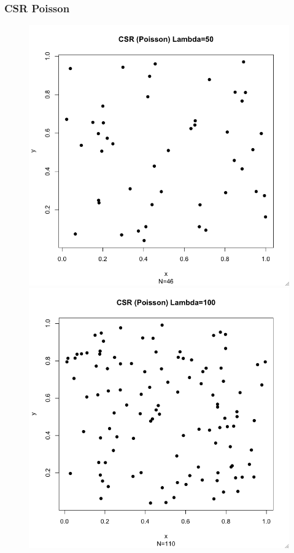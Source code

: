 \documentclass[nototal,handout]{beamer}
\begin{document}
\begin{frame}
	\frametitle{CSR Poisson}
 \begin{figure}[ht]
 \begin{minipage}[b]{0.4\linewidth}
  \centering
  \includegraphics[scale=0.20]{csrp50.png}
  \end{minipage}
 \begin{minipage}[b]{0.4\linewidth}
  \centering
  \includegraphics[scale=0.20]{csrp100.png}
  \end{minipage}
  \end{figure}
 \end{frame} 
\end{document}

